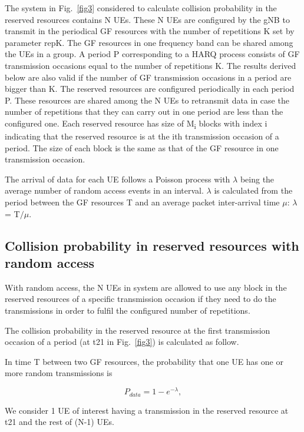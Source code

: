 \documentclass[conference]{IEEEtran}
\begin{document}
The system in Fig.~\ref{fig3} considered to calculate collision probability in the reserved resources contains N UEs. These N UEs are configured by the gNB to transmit in the periodical GF resources with the number of repetitions K set by parameter repK. The GF resources in one frequency band can be shared among the UEs in a group. A period P corresponding to a HARQ process consists of GF transmission occasions equal to the number of repetitions K. The results derived below are also valid if the number of GF transmission occasions in a period are bigger than K. The reserved resources are configured periodically in each period P. These resources are shared among the N UEs to retransmit data in case the number of repetitions that they can carry out in one period are less than the configured one. Each reserved resource has size of M\textsubscript{i} blocks with index i indicating that the reserved resource is at the ith transmission occasion of a period. The size of each block is the same as that of the GF resource in one transmission occasion. 

The arrival of data for each UE follows a Poisson process with $\lambda$ being the average number of random access events in an interval. $\lambda$ is calculated from the period between the GF resources T and an average packet inter-arrival time $\mu$: $\lambda$ = T$/\mu$.

\subsection{Collision probability in reserved resources with random access}\label{IICC}
With random access, the N UEs in system are allowed to use any block in the reserved resources of a specific transmission occasion if they need to do the transmissions in order to fulfil the configured number of repetitions.

The collision probability in the reserved resource at the first transmission occasion of a period (at t21 in Fig.~\ref{fig3}) is calculated as follow.

In time T between two GF resources, the probability that one UE has one or more random transmissions is 

\begin{equation}
P_{data} = 1 - e^{-\lambda},\label{eq1}
\end{equation}

We consider 1 UE of interest having a transmission in the reserved resource at t21 and the rest of (N-1) UEs.
\end{document}
